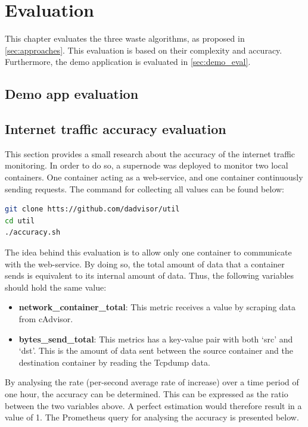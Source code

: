 \chapter{Evaluation}\label{ch:evaluation}
This chapter evaluates the three waste algorithms, as proposed in \autoref{sec:approaches}. This evaluation is based on their complexity and accuracy. Furthermore, the demo application is evaluated in \autoref{sec:demo_eval}.

\section{Demo app evaluation} \label{sec:demo_eval}

\section{Internet traffic accuracy evaluation} \label{sec:eval_k}
This section provides a small research about the accuracy of the internet traffic monitoring. In order to do so, a supernode was deployed to monitor two local containers. One container acting as a web-service, and one container continuously sending requests. The command for collecting all values can be found below:

\begin{lstlisting}[language=bash, caption=Docker-compose]
git clone htts://github.com/dadvisor/util
cd util
./accuracy.sh
\end{lstlisting}

\noindent
The idea behind this evaluation is to allow only one container to communicate with the web-service. By doing so, the total amount of data that a container sends is equivalent to its internal amount of data. Thus, the following variables should hold the same value:
\begin{itemize}
    \item \textbf{network\_container\_total}: This metric receives a value by scraping data from cAdvisor.
    \item \textbf{bytes\_send\_total}: This metrics has a key-value pair with both `src' and `dst'. This is the amount of data sent between the source container and the destination container by reading the Tcpdump data.
\end{itemize}

\noindent
By analysing the rate (per-second average rate of increase) over a time period of one hour, the accuracy can be determined. This can be expressed as the ratio between the two variables above. A perfect estimation would therefore result in a value of 1. The Prometheus query for analysing the accuracy is presented below.

